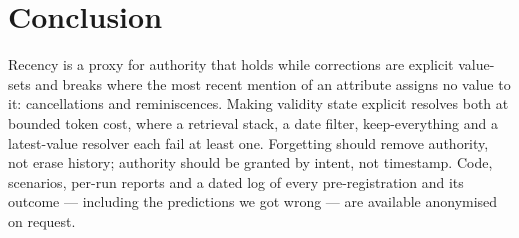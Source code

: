 \documentclass{article}
\begin{document}
\section{Conclusion}

Recency is a proxy for authority that holds while corrections are explicit value-sets and breaks where the most recent mention of an attribute assigns no value to it: cancellations and reminiscences. Making validity state explicit resolves both at bounded token cost, where a retrieval stack, a date filter, keep-everything and a latest-value resolver each fail at least one. Forgetting should remove authority, not erase history; authority should be granted by intent, not timestamp. Code, scenarios, per-run reports and a dated log of every pre-registration and its outcome --- including the predictions we got wrong --- are available anonymised on request.

\label{endbody}



\end{document}
